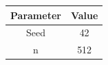\begin{tabular}{cc}
\hline
Parameter & Value \\
\hline
Seed & 42 \\
n & 512 \\
\hline
\end{tabular}
